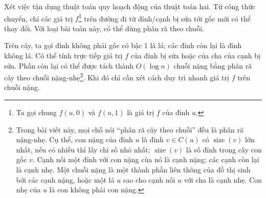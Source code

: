 \documentclass[11pt]{article}
\begin{document}
Xét việc tận dụng thuật toán quy hoạch động của thuật toán hai. Từ công thức
chuyển, chỉ các giá trị \(f\)\footnote{Ta gọi chung \(f(u,0)\) và \(f(u,1)\)
là giá trị \(f\) của đỉnh \(u\).} trên đường đi từ đỉnh/cạnh bị sửa tới gốc
mới có thể thay đổi. Với loại bài toán này, có thể dùng phân rã theo chuỗi.

Trên cây, ta gọi đỉnh không phải gốc có bậc 1 là lá; các đỉnh còn lại là đỉnh
không lá. Có thể tính trực tiếp giá trị \(f\) của đỉnh bị sửa hoặc của cha của
cạnh bị sửa. Phần còn lại có thể được tách thành \(O(\log n)\) chuỗi nặng
bằng phân rã cây theo chuỗi nặng-nhẹ\footnote{Trong bài viết này, mọi chỗ nói
``phân rã cây theo chuỗi'' đều là phân rã nặng-nhẹ. Cụ thể, con nặng của
đỉnh \(u\) là đỉnh \(v\in C(u)\) có \(\operatorname{size}(v)\) lớn nhất, nếu
có nhiều thì lấy chỉ số nhỏ nhất; \(\operatorname{size}(v)\) là số đỉnh trong
cây con gốc \(v\). Cạnh nối một đỉnh với con nặng của nó là cạnh nặng; các
cạnh còn lại là cạnh nhẹ. Một chuỗi nặng là một thành phần liên thông của đồ
thị sinh bởi các cạnh nặng, hoặc một lá \(u\) sao cho cạnh nối \(u\) với cha
là cạnh nhẹ. Con nhẹ của \(u\) là con không phải con nặng.}. Khi đó chỉ cần
xét cách duy trì nhanh giá trị \(f\) trên chuỗi nặng.
\end{document}
